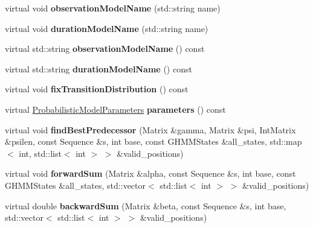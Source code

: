 \begin{DoxyCompactItemize}
virtual void {\bfseries observation\+Model\+Name} (std\+::string name)
\item 
\mbox{\label{classtops_1_1GHMMState_a74b5d6f4fc4fc45d102a7f1199c3f147}} 
virtual void {\bfseries duration\+Model\+Name} (std\+::string name)
\item 
\mbox{\label{classtops_1_1GHMMState_adf5b5592a4be45f5227932be94d9ec71}} 
virtual std\+::string {\bfseries observation\+Model\+Name} () const
\item 
\mbox{\label{classtops_1_1GHMMState_a5193759c7ad20b08bda548e208450dae}} 
virtual std\+::string {\bfseries duration\+Model\+Name} () const
\item 
\mbox{\label{classtops_1_1GHMMState_a3458044303664790d6b94bedcd93817e}} 
virtual void {\bfseries fix\+Transition\+Distribution} () const
\item 
\mbox{\label{classtops_1_1GHMMState_ad20832debfe3bdc2b6d596c90f3ebbe6}} 
virtual \hyperlink{classtops_1_1ProbabilisticModelParameters}{Probabilistic\+Model\+Parameters} {\bfseries parameters} () const
\item 
\mbox{\label{classtops_1_1GHMMState_a90571a7a103183c61b548ffa5ad6664a}} 
virtual void {\bfseries find\+Best\+Predecessor} (Matrix \&gamma, Matrix \&psi, Int\+Matrix \&psilen, const Sequence \&s, int base, const G\+H\+M\+M\+States \&all\+\_\+states, std\+::map$<$ int, std\+::list$<$ int $>$ $>$ \&valid\+\_\+positions)
\item 
\mbox{\label{classtops_1_1GHMMState_a5f3bbebf623a5b8d7bcbdae77f9ff3b8}} 
virtual void {\bfseries forward\+Sum} (Matrix \&alpha, const Sequence \&s, int base, const G\+H\+M\+M\+States \&all\+\_\+states, std\+::vector$<$ std\+::list$<$ int $>$ $>$ \&valid\+\_\+positions)
\item 
\mbox{\label{classtops_1_1GHMMState_a99ddf156640eee462b671403df991db0}} 
virtual double {\bfseries backward\+Sum} (Matrix \&beta, const Sequence \&s, int base, std\+::vector$<$ std\+::list$<$ int $>$ $>$ \&valid\+\_\+positions)
\item 

\end{DoxyCompactItemize}
